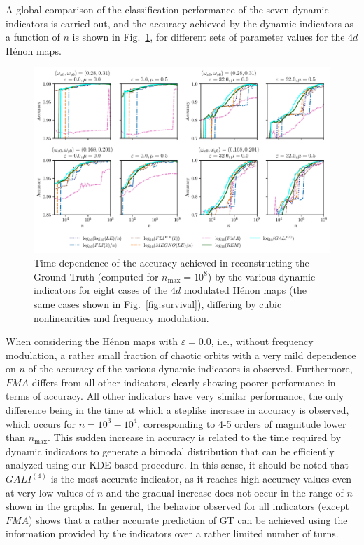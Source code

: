 A global comparison of the classification performance of the seven dynamic indicators is carried out, and the accuracy achieved by the dynamic indicators as a function of $n$ is shown in Fig.~\ref{fig:performance}, for different sets of parameter values for the $4d$ Hénon maps. 

\begin{figure}[htp]
    \centering
    \includegraphics[width=1.0\textwidth]{6_dynamic_indicators/fig/corrected_figs/performance.pdf}
    \caption{Time dependence of the accuracy achieved in reconstructing the Ground Truth (computed for $n_\text{max}=10^8$) by the various dynamic indicators for eight cases of the $4d$ modulated Hénon maps (the same cases shown in Fig.~\ref{fig:survival}), differing by cubic nonlinearities and frequency modulation.}
    \label{fig:performance}
\end{figure}

When considering the Hénon maps with $\varepsilon=0.0$, i.e., without frequency modulation, a rather small fraction of chaotic orbits with a very mild dependence on $n$ of the accuracy of the various dynamic indicators is observed. Furthermore, $FMA$ differs from all other indicators, clearly showing poorer performance in terms of accuracy. All other indicators have very similar performance, the only difference being in the time at which a steplike increase in accuracy is observed, which occurs for $n = 10^3 - 10^4$, corresponding to 4-5 orders of magnitude lower than $n_\text{max}$. This sudden increase in accuracy is related to the time required by dynamic indicators to generate a bimodal distribution that can be efficiently analyzed using our KDE-based procedure. In this sense, it should be noted that $GALI^{(4)}$ is the most accurate indicator, as it reaches high accuracy values even at very low values of $n$ and the gradual increase does not occur in the range of $n$ shown in the graphs. In general, the behavior observed for all indicators (except $FMA$) shows that a rather accurate prediction of GT can be achieved using the information provided by the indicators over a rather limited number of turns.

